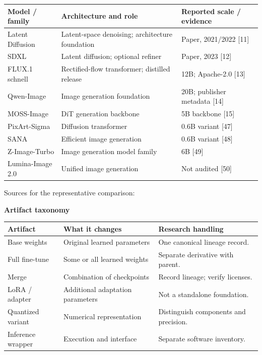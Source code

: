 \documentclass[11pt,a4paper]{article}
\newcommand{\sub}[1]{\vspace{1mm}\textbf{#1}\par}
\begin{document}
\begin{center}\small\begin{tabularx}{\linewidth}{@{}>{\RaggedRight\arraybackslash}p{.25\linewidth}>{\RaggedRight\arraybackslash}p{.42\linewidth}>{\RaggedRight\arraybackslash}p{.26\linewidth}@{}}\toprule
\textbf{Model / family} & \textbf{Architecture and role} & \textbf{Reported scale / evidence}\\\midrule
Latent Diffusion & Latent-space denoising; architecture foundation & Paper, 2021/2022 [11]\\
SDXL & Latent diffusion; optional refiner & Paper, 2023 [12]\\
FLUX.1 schnell & Rectified-flow transformer; distilled release & 12B; Apache-2.0 [13]\\
Qwen-Image & Image generation foundation & 20B; publisher metadata [14]\\
MOSS-Image & DiT generation backbone & 5B backbone [15]\\
PixArt-Sigma & Diffusion transformer & 0.6B variant [47]\\
SANA & Efficient image generation & 0.6B variant [48]\\
Z-Image-Turbo & Image generation model family & 6B [49]\\
Lumina-Image 2.0 & Unified image generation & Not audited [50]\\\bottomrule\end{tabularx}\end{center}

Sources for the representative comparison:  \cite{ldm,sdxl,flux,qwen,moss,pixart,sana,zimage,lumina}


\sub{Artifact taxonomy}

\begin{center}\small\begin{tabularx}{\linewidth}{@{}YYY@{}}\toprule
\textbf{Artifact} & \textbf{What it changes} & \textbf{Research handling}\\\midrule
Base weights & Original learned parameters & One canonical lineage record.\\
Full fine-tune & Some or all learned weights & Separate derivative with parent.\\
Merge & Combination of checkpoints & Record lineage; verify licenses.\\
LoRA / adapter & Additional adaptation parameters & Not a standalone foundation.\\
Quantized variant & Numerical representation & Distinguish components and precision.\\
Inference wrapper & Execution and interface & Separate software inventory.\\\bottomrule\end{tabularx}\end{center}
\end{document}
